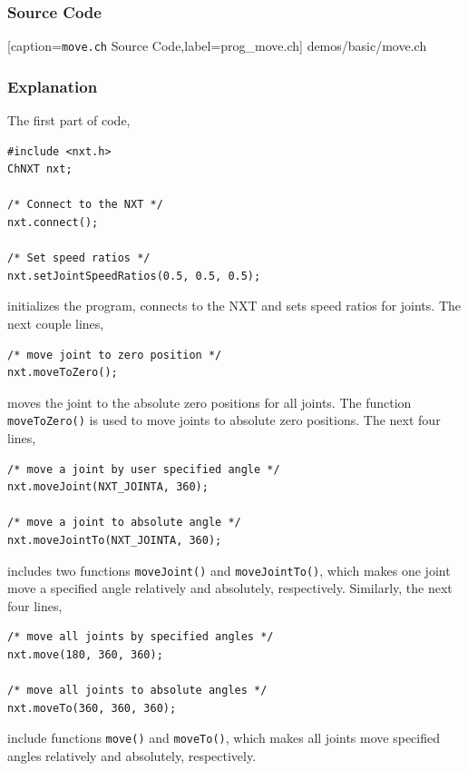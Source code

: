 \documentclass[11pt]{article}
\begin{document}
\subsubsection*{Source Code}

    [caption={{\tt move.ch} Source Code},label=prog_move.ch]
    {demos/basic/move.ch}

\subsubsection*{Explanation}
The first part of code,
\begin{lstlisting}
#include <nxt.h>
ChNXT nxt;

/* Connect to the NXT */
nxt.connect();

/* Set speed ratios */
nxt.setJointSpeedRatios(0.5, 0.5, 0.5);
\end{lstlisting}
initializes the program, connects to the NXT and sets speed ratios for joints. 
The next couple lines,
\begin{lstlisting}
/* move joint to zero position */
nxt.moveToZero();
\end{lstlisting}
moves the joint to the absolute zero positions for all joints. The function 
{\tt moveToZero()} is used to move joints to absolute zero positions. The next 
four lines,

\begin{lstlisting}
/* move a joint by user specified angle */
nxt.moveJoint(NXT_JOINTA, 360);

/* move a joint to absolute angle */
nxt.moveJointTo(NXT_JOINTA, 360);
\end{lstlisting}
includes two functions {\tt moveJoint()} and {\tt moveJointTo()}, which makes 
one joint move a specified angle relatively and absolutely, respectively. 
Similarly, the next four lines,
\begin{lstlisting}
/* move all joints by specified angles */
nxt.move(180, 360, 360);

/* move all joints to absolute angles */
nxt.moveTo(360, 360, 360);
\end{lstlisting}
include functions {\tt move()} and {\tt moveTo()}, which makes all joints 
move specified angles relatively and absolutely, respectively.

\end{document}
